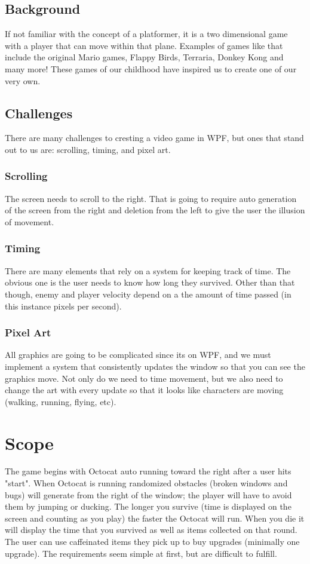 \documentclass[10pt,conference,onecolumn,compsoc]{IEEEtran}
\begin{document}
\subsection{Background}
If not familiar with the concept of a platformer, it is a two dimensional game with a player that can move within that plane. Examples of games like that include the original Mario games, Flappy Birds, Terraria, Donkey Kong and many more! These games of our childhood have inspired us to create one of our very own.


\subsection{Challenges}
There are many challenges to cresting a video game in WPF, but ones that stand out to us are: scrolling, timing, and pixel art.

\subsubsection{Scrolling} The screen needs to scroll to the right. That is going to require auto generation of the screen from the right and deletion from the left to give the user the illusion of movement. 

\subsubsection{Timing}There are many elements that rely on a system for keeping track of time. The obvious one is the user needs to know how long they survived. Other than that though, enemy and player velocity depend on a the amount of time passed (in this instance pixels per second).

\subsubsection{Pixel Art}All graphics are going to be complicated since its on WPF, and we must implement a system that consistently updates the window so that you can see the graphics move. Not only do we need to time movement, but we also need to change the art with every update so that it looks like characters are moving (walking, running, flying, etc).



\section{Scope}
The game begins with Octocat auto running toward the right after a user hits "start". When Octocat is running randomized obstacles (broken windows and bugs) will generate from the right of the window; the player will have to avoid them by jumping or ducking. The longer you survive (time is displayed on the screen and counting as you play) the faster the Octocat will run. When you die it will display the time that you survived as well as items collected on that round. The user can use caffeinated items they pick up to buy upgrades (minimally one upgrade). The requirements seem simple at first, but are difficult to fulfill.
\end{document}
